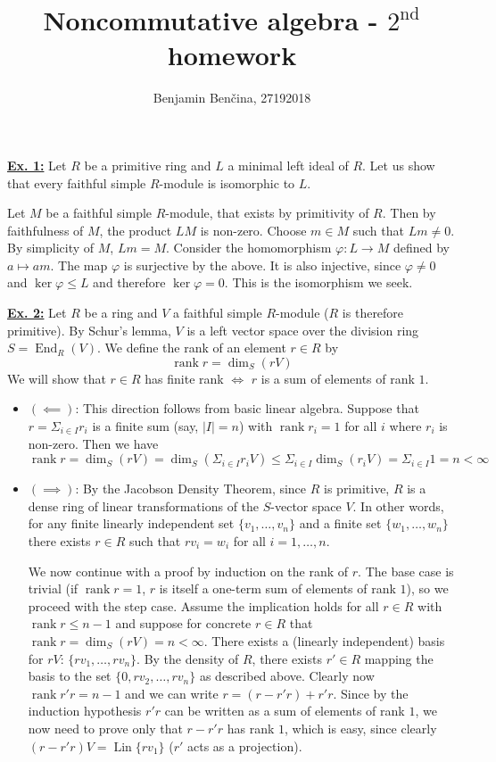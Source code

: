 \documentclass[a4paper, 12pt]{article}
\title{Noncommutative algebra - $2^{\text{nd}}$ homework}
\author{Benjamin Benčina, 27192018}
\DeclareMathOperator{\rank}{rank}
\DeclareMathOperator{\Lin}{Lin}
\DeclareMathOperator{\End}{End}
\begin{document}
\maketitle

\underline{\textbf{Ex. 1:}}
Let $R$ be a primitive ring and $L$ a minimal left ideal of $R$. Let us show that every faithful simple $R$-module is isomorphic to $L$.
 
Let $M$ be a faithful simple $R$-module, that exists by primitivity of $R$. Then by faithfulness of $M$, the product $LM$ is non-zero. Choose $m \in M$ such that $Lm \neq 0$. By simplicity of $M$, $Lm = M$. Consider the homomorphism $\varphi \colon L \to M$ defined by $a \mapsto am$. The map $\varphi$ is surjective by the above. It is also injective, since $\varphi \neq 0$ and $\ker \varphi \leq L$ and therefore $\ker\varphi = 0$. This is the isomorphism we seek.
\newline

\underline{\textbf{Ex. 2:}}
Let $R$ be a ring and $V$ a faithful simple $R$-module ($R$ is therefore primitive). By Schur's lemma, $V$ is a left vector space over the division ring $S = \End_R(V)$. We define the rank of an element $r \in R$ by
\[
\rank r = \dim_S(rV)
\]
We will show that $r \in R$ has finite rank $\iff$ $r$ is a sum of elements of rank $1$.
\begin{itemize}
	\item $(\impliedby)$: This direction follows from basic linear algebra. Suppose that $r = \Sigma_{i \in I}r_i$ is a finite sum (say, $|I| = n$) with $\rank r_i = 1$ for all $i$ where $r_i$ is non-zero.
	Then we have
	\[
	\rank r = \dim_S(rV) = \dim_S\left(\Sigma_{i \in I}r_iV\right) \leq \Sigma_{i \in I} \dim_S(r_iV) = \Sigma_{i \in I} 1 = n < \infty
	\]
	\item $(\implies)$: By the Jacobson Density Theorem, since $R$ is primitive, $R$ is a dense ring of linear transformations of the $S$-vector space $V$. In other words, for any finite linearly independent set $\lbrace v_1, \dots, v_n \rbrace$ and a finite set $\lbrace w_1, \dots, w_n \rbrace$ there exists $r \in R$ such that $rv_i = w_i$ for all $i = 1,\dots,n$.
	
	We now continue with a proof by induction on the rank of $r$. The base case is trivial (if $\rank r = 1$, $r$ is itself a one-term sum of elements of rank $1$), so we proceed with the step case. Assume the implication holds for all $r \in R$ with $\rank r \leq n-1$ and suppose for concrete $r \in R$ that $\rank r = \dim_S(rV) = n < \infty$. There exists a (linearly independent) basis for $rV$: $\lbrace rv_1, \dots, rv_n\rbrace$. By the density of $R$, there exists $r' \in R$ mapping the basis to the set $\lbrace 0, rv_2, \dots, rv_n\rbrace$ as described above. Clearly now $\rank r'r = n-1$ and we can write $r = (r - r'r) + r'r$. Since by the induction hypothesis $r'r$ can be written as a sum of elements of rank $1$, we now need to prove only that $r - r'r$ has rank $1$, which is easy, since clearly $(r-r'r)V = \Lin\lbrace rv_1 \rbrace$ ($r'$ acts as a projection).
\end{itemize}
\end{document}
